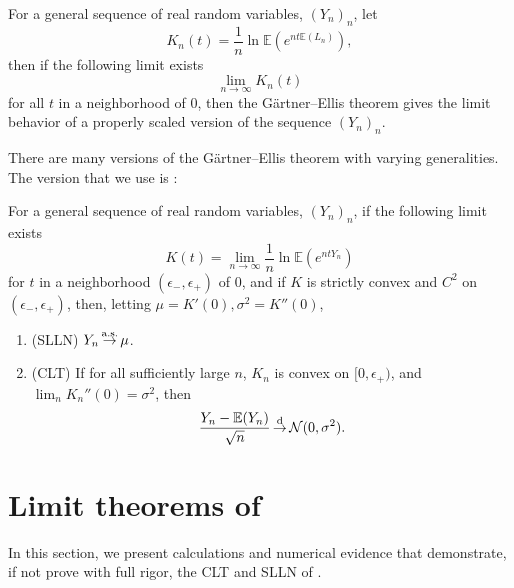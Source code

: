 For a general sequence of real random variables, $(Y_n)_n$, let 
$$K_n(t) = \frac 1 n \ln {\mathbb{{{E}}}}{\left({e}^{{{n}{t}{\mathbb{{{E}}}}{\left({L}_{{n}}\right)}}}\right)},$$
then if the following limit exists
$$\lim_{n\to \infty}K_n(t)$$
for all $t$ in a neighborhood of $0$, then the G\"artner--Ellis theorem gives the limit behavior of a properly scaled version of the sequence $(Y_n)_n$.

There are many versions of the G\"artner--Ellis theorem with varying generalities. The version that we use is \cite[Lemma 1]{coxLargeDeviationsPoisson1984}:
\begin{theorem}
\label{theorem:gartner}
For a general sequence of real random variables, $(Y_n)_n$, if the following limit exists
$$K(t) = \lim_{n\to \infty}\frac 1 n \ln \displaystyle{\mathbb{{{E}}}}{\left({e}^{{{n}{t}{Y}_{{n}}}}\right)}$$
for $t$ in a neighborhood $(\epsilon_-, \epsilon_+)$ of $0$, and if $K$ is strictly convex and $C^2$ on $(\epsilon_-, \epsilon_+)$, then, letting $\mu = K'(0), \sigma^2 = K''(0)$,
\begin{enumerate}[(1)]
	\item (SLLN) $Y_n \operatorname*{\stackrel{\text {a.s.}}{\rightarrow}} \mu$.
	\item (CLT) If for all sufficiently large $n$, $K_n$ is convex on $[0, \epsilon_+)$, and $\lim_n K_n''(0) = \sigma^2$, then \begin{equation}
		\frac{Y_n - \mathbb{E}(Y_n)}{\sqrt{n}} \operatorname*{\stackrel{\text {d}}{\to}} \mathcal{N}(0, \sigma^2).
	\end{equation}
\end{enumerate}
\end{theorem}

\section{Limit theorems of \cvar}
In this section, we present calculations and numerical evidence that demonstrate, if not prove with full rigor, the CLT and SLLN of \cvar.

